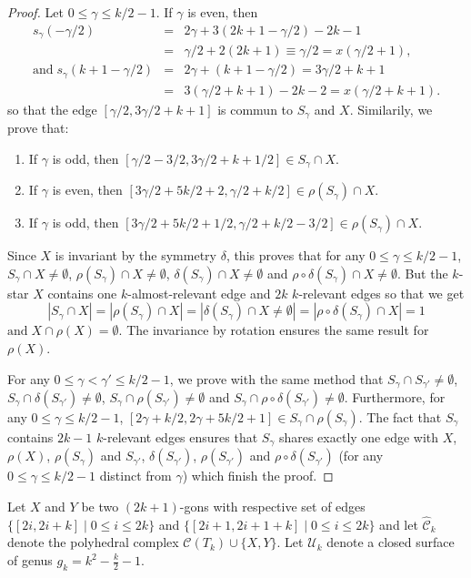 \documentclass[12pt]{amsart}
\begin{document}
\begin{proof}
Let $0\le\gamma\le k/2-1$.
If $\gamma$ is even, then
\begin{eqnarray*}
s_{\gamma}(-\gamma/2)&=&2\gamma+3(2k+1-\gamma/2)-2k-1\\
&=&\gamma/2+2(2k+1)\equiv \gamma/2=x(\gamma/2+1),\\
\mathrm{and}\;s_{\gamma}(k+1-\gamma/2)&=&2\gamma+(k+1-\gamma/2)=3\gamma/2+k+1\\
&=&3(\gamma/2+k+1)-2k-2=x(\gamma/2+k+1).
\end{eqnarray*}
so that the edge $[\gamma/2,3\gamma/2+k+1]$ is commun to $S_\gamma$ and $X$.
Similarily, we prove that:
\begin{enumerate}
\item If $\gamma$ is odd, then $[\gamma/2-3/2,3\gamma/2+k+1/2]\in S_\gamma\cap X$.
\item If $\gamma$ is even, then $[3\gamma/2+5k/2+2,\gamma/2+k/2]\in\rho(S_\gamma)\cap X$.
\item If $\gamma$ is odd, then $[3\gamma/2+5k/2+1/2,\gamma/2+k/2-3/2]\in\rho(S_\gamma)\cap X$.
\end{enumerate}
Since $X$ is invariant by the symmetry $\delta$, this proves that for any $0\le\gamma\le k/2-1$,
$S_\gamma\cap X\ne\emptyset$, $\rho(S_\gamma)\cap X\ne\emptyset$, $\delta(S_\gamma)\cap X\ne\emptyset$ and $\rho\circ\delta(S_\gamma)\cap X\ne\emptyset$.
But the $k$-star $X$ contains one $k$-almost-relevant edge and $2k$ $k$-relevant edges so that we get
$$|S_\gamma\cap X|=|\rho(S_\gamma)\cap X|=|\delta(S_\gamma)\cap X\ne\emptyset|=|\rho\circ\delta(S_\gamma)\cap X|=1$$
$\mathrm{and}\; X\cap\rho(X)=\emptyset$. The invariance by rotation ensures the same result for $\rho(X)$.

For any $0\le\gamma<\gamma'\le k/2-1$, we prove with the same method that $S_\gamma\cap S_{\gamma'}\ne\emptyset$, $S_\gamma\cap \delta(S_{\gamma'})\ne\emptyset$, $S_\gamma\cap \rho(S_{\gamma'})\ne\emptyset$ and $S_\gamma\cap \rho\circ\delta(S_{\gamma'})\ne\emptyset$.
Furthermore, for any $0\le\gamma\le k/2-1$, $[2\gamma+k/2,2\gamma+5k/2+1]\in S_\gamma\cap \rho(S_{\gamma})$. The fact that $S_\gamma$ contains $2k-1$ $k$-relevant edges ensures that $S_\gamma$ shares exactly one edge with $X$, $\rho(X)$, $\rho(S_\gamma)$ and $S_{\gamma'}$, $\delta(S_{\gamma'})$, $\rho(S_{\gamma'})$ and $\rho\circ\delta(S_{\gamma'})$ (for any $0\le\gamma\le k/2-1$ distinct from $\gamma$) which finish the proof.
\end{proof}

Let $X$ and $Y$ be two $(2k+1)$-gons with respective set of edges $\{[2i,2i+k]\;|\; 0\le i\le 2k\}$ and $\{[2i+1,2i+1+k]\;|\; 0\le i\le 2k\}$ and let $\hat{\mathcal{C}}_k$ denote the polyhedral complex $\mathcal{C}(T_k)\cup\{X,Y\}$.
Let $\mathcal{U}_k$ denote a closed surface of genus $g_k=k^2-\frac{k}{2}-1$.
\end{document}
